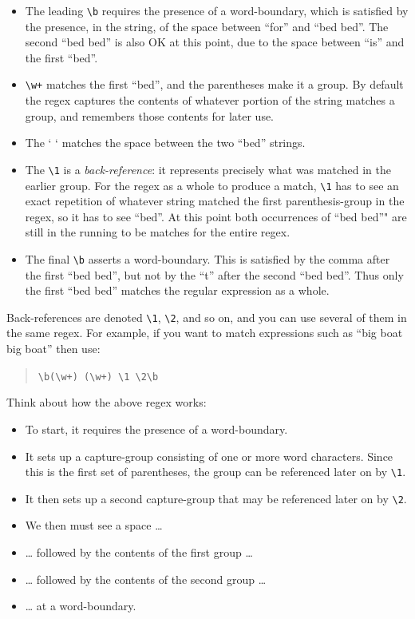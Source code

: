 \documentclass[]{book}
\providecommand{\tightlist}{%
  \setlength{\itemsep}{0pt}\setlength{\parskip}{0pt}}
\theoremstyle{definition}
\theoremstyle{definition}
\theoremstyle{remark}
\begin{document}
{\begin{itemize}
\tightlist
\item
  The leading \texttt{\textbackslash{}b} requires the presence of a
  word-boundary, which is satisfied by the presence, in the string, of
  the space between ``for'' and ``bed bed''. The second ``bed bed'' is
  also OK at this point, due to the space between ``is'' and the first
  ``bed''.
\item
  \texttt{\textbackslash{}w+} matches the first ``bed'', and the
  parentheses make it a group. By default the regex captures the
  contents of whatever portion of the string matches a group, and
  remembers those contents for later use.
\item
  The ` ` matches the space between the two ``bed'' strings.
\item
  The \texttt{\textbackslash{}1} is a \emph{back-reference}:
  it represents precisely what was matched in the
  earlier group. For the regex as a whole to produce a match,
  \texttt{\textbackslash{}1} has to see an exact repetition of whatever
  string matched the first parenthesis-group in the regex, so it has to
  see ``bed''. At this point both occurrences of ``bed bed''" are still
  in the running to be matches for the entire regex.
\item
  The final \texttt{\textbackslash{}b} asserts a word-boundary. This is
  satisfied by the comma after the first ``bed bed'', but not by the
  ``t'' after the second ``bed bed''. Thus only the first ``bed bed''
  matches the regular expression as a whole.
\end{itemize}

Back-references are denoted \texttt{\textbackslash{}1},
\texttt{\textbackslash{}2}, and so on, and you can use several of them
in the same regex. For example, if you want to match expressions such as
``big boat big boat'' then use:

\begin{quote}
\texttt{\textbackslash{}b(\textbackslash{}w+)\ (\textbackslash{}w+)\ \textbackslash{}1\ \textbackslash{}2\textbackslash{}b}
\end{quote}

Think about how the above regex works:

\begin{itemize}
\tightlist
\item
  To start, it requires the presence of a word-boundary.
\item
  It sets up a capture-group consisting of one or more word characters.
  Since this is the first set of parentheses, the group can be
  referenced later on by \texttt{\textbackslash{}1}.
\item
  It then sets up a second capture-group that may be referenced later on
  by \texttt{\textbackslash{}2}.
\item
  We then must see a space \ldots{}
\item
  \ldots{} followed by the contents of the first group \ldots{}
\item
  \ldots{} followed by the contents of the second group \ldots{}
\item
  \ldots{} at a word-boundary.
\end{itemize}

}
\end{document}
